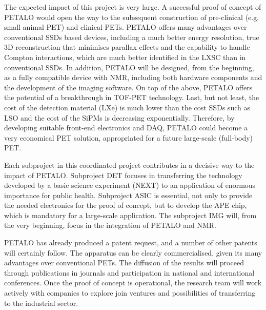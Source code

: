 
The expected impact of this project is very large. A successful proof of concept of PETALO would open the way to the subsequent construction of pre-clinical (e.g, small animal PET) and clinical PETs. PETALO offers many advantages over conventional SSDs based devices, including a much better energy resolution, true 3D reconstruction that minimises parallax effects and the capability to handle Compton interactions, which are much better identified in the LXSC than in conventional SSDs. In addition, PETALO will be designed, from the beginning, as a fully compatible device with NMR, including both hardware components and the development of the imaging software. On top of the above, PETALO offers the potential of a breakthrough in TOF-PET technology. Last, but not least, the cost of the detection material (LXe) is much lower than the cost SSDs such as LSO and the cost of the SiPMs is decreasing exponentially. Therefore, by developing suitable front-end electronics and DAQ, PETALO could become a very economical PET solution, appropriated for a future large-scale (full-body) PET.

Each subproject in this coordinated project contributes in a decisive way to the impact of PETALO. Subproject DET focuses in transferring the technology developed by a basic science experiment (NEXT) to an application of enormous importance for public health. Subproject ASIC is essential, not only to provide the needed electronics for the proof of concept, but to develop the APE chip, which is mandatory for a large-scale application. The subproject IMG will, from the very beginning, focus in the integration of PETALO and NMR. 

PETALO has already produced a patent request, and a number of other patents will certainly follow. The apparatus can be clearly commercialised, given its many advantages over conventional PETs. The diffusion of the results will proceed through publications in journals and participation in national and international conferences. Once the proof of concept is operational, the research team will work actively with companies to explore join ventures and possibilities of transferring to the industrial sector. 
